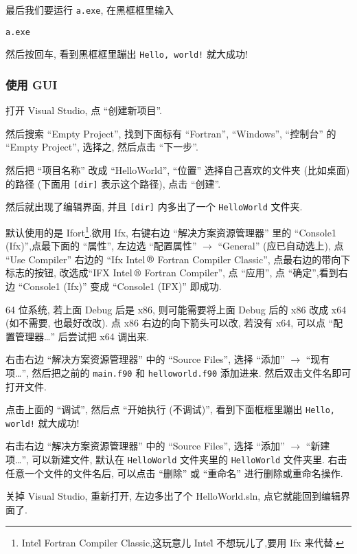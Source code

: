 最后我们要运行 \texttt{a.exe}, 在黑框框里输入
\begin{verbatim}
a.exe
\end{verbatim}
然后按回车, 看到黑框框里蹦出 \texttt{Hello, world!} 就大成功!

\subsubsection{使用 GUI}

打开 Visual Studio, 点 ``创建新项目''.

然后搜索 ``Empty Project'', 找到下面标有 ``Fortran'', ``Windows'', ``控制台'' 的 ``Empty Project'', 选择之, 然后点击 ``下一步''.

然后把 ``项目名称'' 改成 ``HelloWorld'', ``位置'' 选择自己喜欢的文件夹 (比如桌面) 的路径 (下面用 \texttt{[dir]} 表示这个路径), 点击 ``创建''.

然后就出现了编辑界面, 并且 \texttt{[dir]} 内多出了一个 \texttt{HelloWorld} 文件夹.

默认使用的是 Ifort\footnote{Intel\r{} Fortran Compiler Classic,这玩意儿 Intel\r{} 不想玩儿了,要用 Ifx 来代替.}.欲用 Ifx, 右键右边 ``解决方案资源管理器'' 里的 ``Console1 (Ifx)'',点最下面的 ``属性'', 左边选 ``配置属性'' $\rightarrow$ ``General'' (应已自动选上), 点 ``Use Compiler'' 右边的 ``Ifx Intel$\,\text{\textregistered}$ Fortran Compiler Classic'', 点最右边的带向下标志的按钮, 改选成``IFX Intel$\,\text{\textregistered}$ Fortran Compiler'', 点 ``应用'', 点 ``确定'',看到右边 ``Console1 (Ifx)'' 变成 ``Console1 (IFX)'' 即成功.

64 位系统, 若上面 Debug 后是 x86, 则可能需要将上面 Debug 后的 x86 改成 x64 (如不需要, 也最好改改). 点 x86 右边的向下箭头可以改, 若没有 x64, 可以点 ``配置管理器\dots'' 后尝试把 x64 调出来.

右击右边 ``解决方案资源管理器'' 中的 ``Source Files'', 选择 ``添加'' $\rightarrow$ ``现有项\dots'', 然后把之前的 \texttt{main.f90} 和 \texttt{helloworld.f90} 添加进来. 然后双击文件名即可打开文件.

点击上面的 ``调试'', 然后点 ``开始执行 (不调试)'', 看到下面框框里蹦出 \texttt{Hello, world!} 就大成功!

右击右边 ``解决方案资源管理器'' 中的 ``Source Files'', 选择 ``添加'' $\rightarrow$ ``新建项\dots'', 可以新建文件, 默认在 \texttt{HelloWorld} 文件夹里的 \texttt{HelloWorld} 文件夹里. 右击任意一个文件的文件名后, 可以点击 ``删除'' 或 ``重命名'' 进行删除或重命名操作.

关掉 Visual Studio, 重新打开, 左边多出了个 HelloWorld.sln, 点它就能回到编辑界面了.

